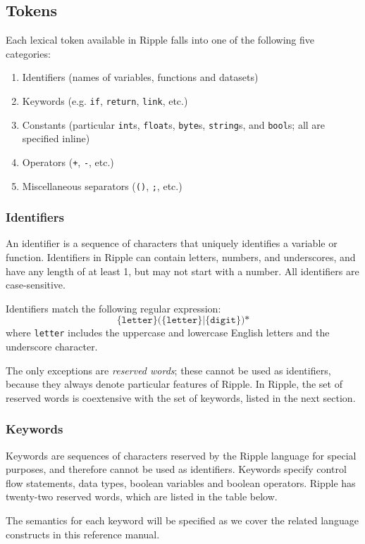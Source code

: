 \documentclass{article}
\newcommand{\code}{\texttt}
\begin{document}
\subsection{Tokens}
Each lexical token available in Ripple falls into one of the following five categories:
\begin{enumerate}
    \item Identifiers (names of variables, functions and datasets)
    \item Keywords (e.g. \code{if}, \code{return}, \code{link}, etc.)
    \item Constants (particular \code{int}s, \code{float}s, \code{byte}s, \code{string}s, and \code{bool}s; all are specified inline)
    \item Operators (\code{+}, \code{-}, etc.)
    \item Miscellaneous separators (\code{()}, \code{;}, etc.)
\end{enumerate}

\subsubsection{Identifiers}
An identifier is a sequence of characters that uniquely identifies a variable or function. Identifiers in Ripple can contain letters, numbers, and underscores, and have any length of at least 1, but may not start with a number. All identifiers are case-sensitive.

Identifiers match the following regular expression:
\[ \code{\{letter\}(\{letter\}|\{digit\})*} \]
where \code{letter} includes the uppercase and lowercase English letters and the underscore character.

The only exceptions are \emph{reserved words}; these cannot be used as identifiers, because they always denote particular features of Ripple. In Ripple, the set of reserved words is coextensive with the set of keywords, listed in the next section.

\subsubsection{Keywords}
Keywords are sequences of characters reserved by the Ripple language for special purposes, and therefore cannot be used as identifiers. Keywords specify control flow statements, data types, boolean variables and boolean operators. Ripple has twenty-two reserved words, which are listed in the table below.

The semantics for each keyword will be specified as we cover the related language constructs in this reference manual. \\
\end{document}
